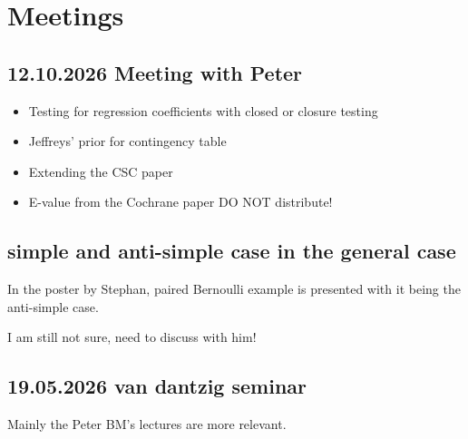 \newpage

\section{Meetings}

\subsection*{12.10.2026 Meeting with Peter}

\begin{itemize}
	\item Testing for regression coefficients with closed or closure testing 
	\item Jeffreys' prior for contingency table
	\item Extending the CSC paper 
	\item E-value from the Cochrane paper DO NOT distribute!
\end{itemize}

\subsection*{simple and anti-simple case in the general case}

In the poster by Stephan, paired Bernoulli example is presented 
with it being the anti-simple case.

I am still not sure, need to discuss with him!

\subsection*{19.05.2026 van dantzig seminar}

Mainly the Peter BM's lectures are more relevant.

